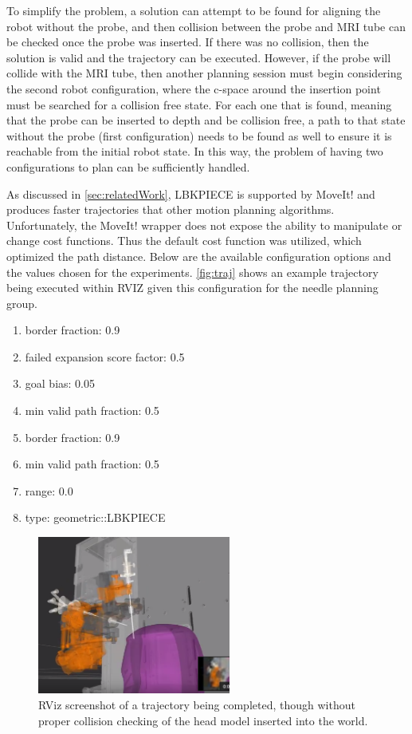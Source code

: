 \documentclass[12pt]{report}
\begin{document}
To simplify the problem, a solution can attempt to be found for aligning the robot without the probe, and then collision between the probe and MRI tube can be checked once the probe was inserted. If there was no collision, then the solution is valid and the trajectory can be executed. However, if the probe will collide with the MRI tube, then another planning session must begin considering the second robot configuration, where the c-space around the insertion point must be searched for a collision free state. For each one that is found, meaning that the probe can be inserted to depth and be collision free, a path to that state without the probe (first configuration) needs to be found as well to ensure it is reachable from the initial robot state. In this way, the problem of having two configurations to plan can be sufficiently handled.

As discussed in \autoref{sec:relatedWork}, LBKPIECE is supported by MoveIt! and produces faster trajectories that other motion planning algorithms. Unfortunately, the MoveIt! wrapper does not expose the ability to manipulate or change cost functions. Thus the default cost function was utilized, which optimized the path distance. Below are the available configuration options and the values chosen for the experiments. \autoref{fig:traj} shows an example trajectory being executed within RVIZ given this configuration for the needle planning group.

\begin{enumerate}
\item border fraction: 0.9
\item failed expansion score factor: 0.5
\item goal bias: 0.05
\item min valid path fraction: 0.5
\item border fraction: 0.9
\item min valid path fraction: 0.5
\item range: 0.0
\item type: geometric::LBKPIECE
\end{enumerate}

\begin{figure}[thpb]
	\centering
	\includegraphics[width = 2.5in]{images/traj.png}
    \caption{RViz screenshot of a trajectory being completed, though without proper collision checking of the head model inserted into the world.}
    \label{fig:traj}
\end{figure}
\end{document}
